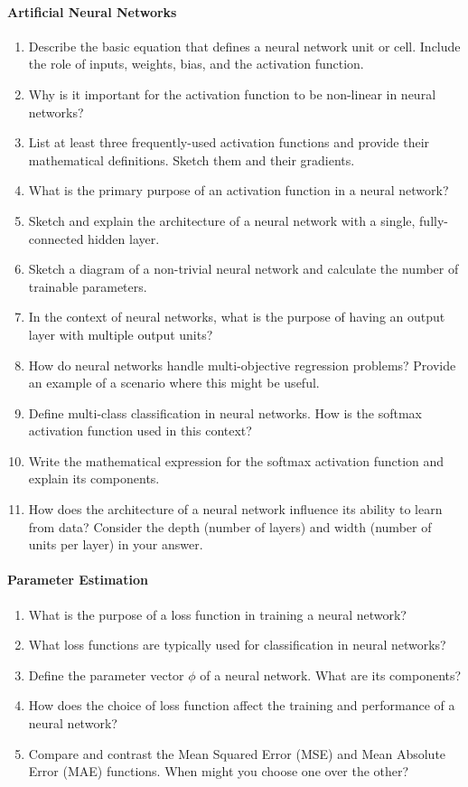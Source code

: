\paragraph*{Artificial Neural Networks}
\begin{enumerate}
    \item Describe the basic equation that defines a neural network unit or cell. Include the role of inputs, weights, bias, and the activation function.
    \item Why is it important for the activation function to be non-linear in neural networks?
    \item List at least three frequently-used activation functions and provide their mathematical definitions. Sketch them and their gradients.
    \item What is the primary purpose of an activation function in a neural network?
    \item Sketch and explain the architecture of a neural network with a single, fully-connected hidden layer.
    \item Sketch a diagram of a non-trivial neural network and calculate the number of trainable parameters.
    \item In the context of neural networks, what is the purpose of having an output layer with multiple output units?
    \item How do neural networks handle multi-objective regression problems? Provide an example of a scenario where this might be useful.
    \item Define multi-class classification in neural networks. How is the softmax activation function used in this context?
    \item Write the mathematical expression for the softmax activation function and explain its components.
    \item How does the architecture of a neural network influence its ability to learn from data? Consider the depth (number of layers) and width (number of units per layer) in your answer.
\end{enumerate}
\paragraph*{Parameter Estimation}
\begin{enumerate}
    \item What is the purpose of a loss function in training a neural network?
    \item What loss functions are typically used for classification in neural networks?
    \item Define the parameter vector $\phi$ of a neural network. What are its components?
    \item How does the choice of loss function affect the training and performance of a neural network?
    \item Compare and contrast the Mean Squared Error (MSE) and Mean Absolute Error (MAE) functions. When might you choose one over the other?
\end{enumerate}
